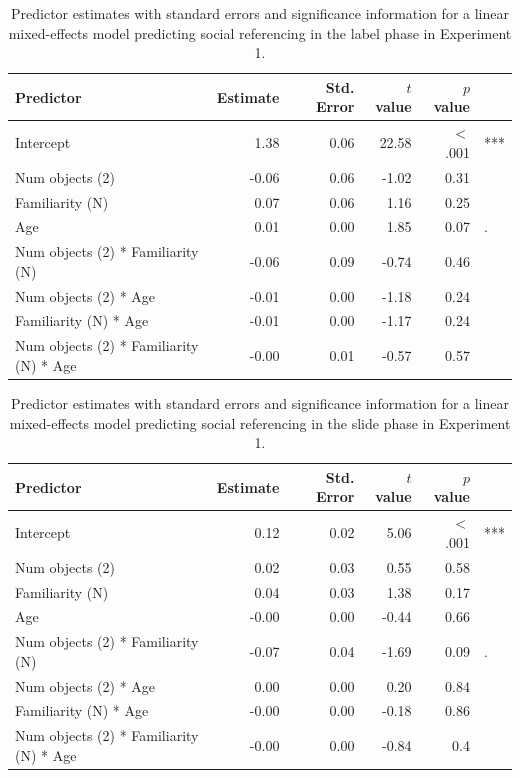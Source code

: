 \documentclass[a4paper,man,apacite,floatsintext]{apa6}
\begin{document}
\begin{table}[tb]
\centering
\begin{tabular}{lrrrrl}
 Predictor & Estimate & Std. Error & $t$ value & $p$ value &  \\ 
  \hline
Intercept & 1.38 & 0.06 & 22.58 & $<$ .001 & *** \\ 
  Num objects (2) & -0.06 & 0.06 & -1.02 & 0.31 &  \\ 
  Familiarity (N) & 0.07 & 0.06 & 1.16 & 0.25 &  \\ 
  Age & 0.01 & 0.00 & 1.85 & 0.07 & . \\ 
  Num objects (2) * Familiarity (N) & -0.06 & 0.09 & -0.74 & 0.46 &  \\ 
  Num objects (2) * Age & -0.01 & 0.00 & -1.18 & 0.24 &  \\ 
  Familiarity (N) * Age & -0.01 & 0.00 & -1.17 & 0.24 &  \\ 
  Num objects (2) * Familiarity (N) * Age & -0.00 & 0.01 & -0.57 & 0.57 &  \\ 
   \hline
\end{tabular}
\caption{Predictor estimates with standard errors and significance information for a linear mixed-effects model predicting social referencing in the label phase in Experiment 1.} 
\label{tab:exp1_l_reg}
\end{table}

\begin{table}[tb]
\centering
\begin{tabular}{lrrrrl}
 Predictor & Estimate & Std. Error & $t$ value & $p$ value &  \\ 
  \hline
Intercept & 0.12 & 0.02 & 5.06 & $<$ .001 & *** \\ 
  Num objects (2) & 0.02 & 0.03 & 0.55 & 0.58 &  \\ 
  Familiarity (N) & 0.04 & 0.03 & 1.38 & 0.17 &  \\ 
  Age & -0.00 & 0.00 & -0.44 & 0.66 &  \\ 
  Num objects (2) * Familiarity (N) & -0.07 & 0.04 & -1.69 & 0.09 & . \\ 
  Num objects (2) * Age & 0.00 & 0.00 & 0.20 & 0.84 &  \\ 
  Familiarity (N) * Age & -0.00 & 0.00 & -0.18 & 0.86 &  \\ 
  Num objects (2) * Familiarity (N) * Age & -0.00 & 0.00 & -0.84 & 0.4 &  \\ 
   \hline
\end{tabular}
\caption{Predictor estimates with standard errors and significance information for a linear mixed-effects model predicting social referencing in the slide phase in Experiment 1.} 
\label{tab:exp1_s_reg}
\end{table}
\end{document}
